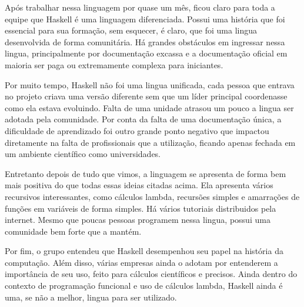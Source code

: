 \documentclass[
  12pt,				         %
  oneside,			       %
  a4paper,			       %
  english,		       	 %
  brazil,			      	 %
]{abntex2}
\begin{document}
    Após trabalhar nessa linguagem por quase um mês, ficou claro para toda a equipe que Haskell é uma linguagem diferenciada. Possui
    uma história que foi essencial para sua formação, sem esquecer, é claro, que foi uma lingua desenvolvida de forma comunitária.
    Há grandes obstáculos em ingressar nessa lingua, principalmente por documentação excassa e a documentação oficial em maioria ser
    paga ou extremamente complexa para iniciantes. 
    
    Por muito tempo, Haskell não foi uma lingua unificada, cada pessoa que entrava no projeto criava uma versão diferente sem que um líder
    principal coordenasse como ela estava evoluindo. Falta de uma unidade atrasou um pouco a lingua ser adotada pela comunidade.
    Por conta da falta de uma documentação única, a dificuldade de aprendizado foi outro grande ponto negativo que impactou diretamente
    na falta de profissionais que a utilização, ficando apenas fechada em um ambiente científico como universidades.

    Entretanto depois de tudo que vimos, a linguagem se apresenta de forma bem mais positiva do que todas essas ideias
    citadas acima. Ela apresenta vários recursivos interessantes, como cálculos lambda, recursões simples e amarrações de funções
    em variáveis de forma simples. Há vários tutoriais distribuidos pela internet. Mesmo que
    poucas pessoas programem nessa lingua, possui uma comunidade bem forte que a mantém.

    Por fim, o grupo entendeu que Haskell desempenhou seu papel na história da computação. Além disso,
    várias empresas ainda o adotam por entenderem a importância de seu uso, feito para cálculos científicos e precisos.
    Ainda dentro do contexto de programação funcional e uso de cálculos lambda, Haskell ainda é uma, se não a melhor,
    lingua para ser utilizado.

    \newpage

    \postextual
\end{document}
